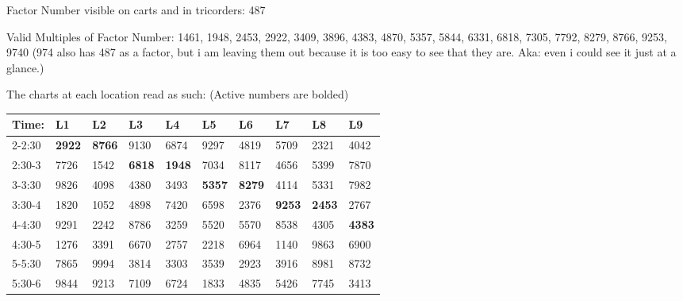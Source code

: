 \documentclass[green]{elementals}
\begin{document}
\name{\gActiveConduitLocations{}}

Factor Number visible on carts and in tricorders: 487

Valid Multiples of Factor Number: 1461, 1948, 2453, 2922, 3409, 3896, 4383, 4870, 5357, 5844, 6331, 6818, 7305, 7792, 8279, 8766, 9253, 9740 (974 also has 487 as a factor, but i am leaving them out because it is too easy to see that they are. Aka: even i could see it just at a glance.)

The charts at each location read as such: (Active numbers are bolded)\\


\begin{tabular}{ l || l |  l | l | l | l | l | l | l | l |}
  Time: & L1 & L2 & L3 & L4 & L5 & L6 & L7 & L8 & L9  \\ \hline \hline
  2-2:30 & {\bf 2922} & {\bf 8766} & 9130 & 6874 & 9297 & 4819 & 5709 & 2321 & 4042 \\ \hline
  2:30-3 & 7726 & 1542 & {\bf 6818} & {\bf 1948} & 7034 & 8117 & 4656 & 5399 & 7870 \\ \hline
  3-3:30 & 9826 & 4098 & 4380 & 3493 & {\bf 5357} & {\bf 8279} & 4114 & 5331 & 7982 \\ \hline
  3:30-4 & 1820 & 1052 & 4898 & 7420 & 6598 & 2376 & {\bf 9253} & {\bf 2453} & 2767 \\ \hline
  4-4:30 & 9291 & 2242 & 8786 & 3259 & 5520 & 5570& 8538 & 4305 & {\bf 4383} \\ \hline
  4:30-5 & 1276 & 3391 & 6670 & 2757 & 2218 & 6964 & 1140 & 9863 & 6900 \\ \hline
  5-5:30 & 7865 & 9994 & 3814 & 3303 & 3539 & 2923 & 3916 & 8981 & 8732 \\ \hline
  5:30-6 & 9844 & 9213 & 7109 & 6724 & 1833 & 4835 & 5426 & 7745 & 3413 \\ \hline
\end{tabular}
\end{document}
